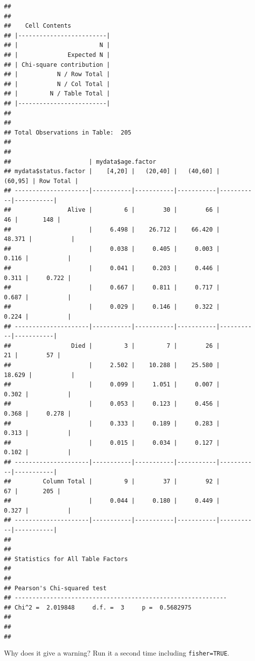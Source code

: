 \documentclass[]{book}
\makeatletter
\newenvironment{Shaded}{\begin{snugshade}}{\end{snugshade}}
\newcommand{\KeywordTok}[1]{\textcolor[rgb]{0.13,0.29,0.53}{\textbf{#1}}}
\newcommand{\DataTypeTok}[1]{\textcolor[rgb]{0.13,0.29,0.53}{#1}}
\newcommand{\OtherTok}[1]{\textcolor[rgb]{0.56,0.35,0.01}{#1}}
\newcommand{\OperatorTok}[1]{\textcolor[rgb]{0.81,0.36,0.00}{\textbf{#1}}}
\newcommand{\NormalTok}[1]{#1}
\newenvironment{kframe}{%
\medskip{}
\setlength{\fboxsep}{.8em}
 \def\at@end@of@kframe{}%
 \ifinner\ifhmode%
  \def\at@end@of@kframe{\end{minipage}}%
  \begin{minipage}{\columnwidth}%
 \fi\fi%
 \def\FrameCommand##1{\hskip\@totalleftmargin \hskip-\fboxsep
 \colorbox{shadecolor}{##1}\hskip-\fboxsep
     \hskip-\linewidth \hskip-\@totalleftmargin \hskip\columnwidth}%
 \MakeFramed {\advance\hsize-\width
   \@totalleftmargin\z@ \linewidth\hsize
   \@setminipage}}%
 {\par\unskip\endMakeFramed%
 \at@end@of@kframe}
\renewenvironment{Shaded}{\begin{kframe}}{\end{kframe}}
\makeatother
\begin{document}
\begin{verbatim}
## 
##  
##    Cell Contents
## |-------------------------|
## |                       N |
## |              Expected N |
## | Chi-square contribution |
## |           N / Row Total |
## |           N / Col Total |
## |         N / Table Total |
## |-------------------------|
## 
##  
## Total Observations in Table:  205 
## 
##  
##                      | mydata$age.factor 
## mydata$status.factor |    [4,20] |   (20,40] |   (40,60] |   (60,95] | Row Total | 
## ---------------------|-----------|-----------|-----------|-----------|-----------|
##                Alive |         6 |        30 |        66 |        46 |       148 | 
##                      |     6.498 |    26.712 |    66.420 |    48.371 |           | 
##                      |     0.038 |     0.405 |     0.003 |     0.116 |           | 
##                      |     0.041 |     0.203 |     0.446 |     0.311 |     0.722 | 
##                      |     0.667 |     0.811 |     0.717 |     0.687 |           | 
##                      |     0.029 |     0.146 |     0.322 |     0.224 |           | 
## ---------------------|-----------|-----------|-----------|-----------|-----------|
##                 Died |         3 |         7 |        26 |        21 |        57 | 
##                      |     2.502 |    10.288 |    25.580 |    18.629 |           | 
##                      |     0.099 |     1.051 |     0.007 |     0.302 |           | 
##                      |     0.053 |     0.123 |     0.456 |     0.368 |     0.278 | 
##                      |     0.333 |     0.189 |     0.283 |     0.313 |           | 
##                      |     0.015 |     0.034 |     0.127 |     0.102 |           | 
## ---------------------|-----------|-----------|-----------|-----------|-----------|
##         Column Total |         9 |        37 |        92 |        67 |       205 | 
##                      |     0.044 |     0.180 |     0.449 |     0.327 |           | 
## ---------------------|-----------|-----------|-----------|-----------|-----------|
## 
##  
## Statistics for All Table Factors
## 
## 
## Pearson's Chi-squared test 
## ------------------------------------------------------------
## Chi^2 =  2.019848     d.f. =  3     p =  0.5682975 
## 
## 
## 
\end{verbatim}

Why does it give a warning? Run it a second time including
\texttt{fisher=TRUE}.

\begin{Shaded}
\end{Shaded}
\end{document}
